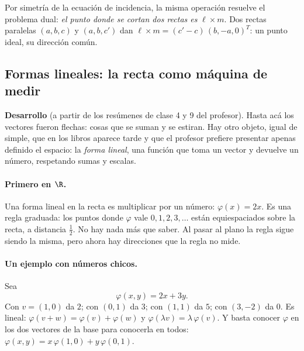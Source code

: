Por simetría de la ecuación de incidencia, la misma operación resuelve el problema dual:
\emph{el punto donde se cortan dos rectas es} \(\ell\times m\). Dos rectas paralelas
\((a,b,c)\) y \((a,b,c')\) dan \(\ell\times m=(c'-c)\,(b,-a,0)^T\): un punto ideal, su
dirección común.

\subsection{Formas lineales: la recta como máquina de medir}\label{sec:formas-lineales}

{\small\vspace{1mm}\par}
{\small\vspace{1mm}\par}


\textbf{Desarrollo} (a partir de los resúmenes de clase 4 y 9 del profesor). Hasta acá los
vectores fueron flechas: cosas que se suman y se estiran. Hay otro objeto, igual de simple,
que en los libros aparece tarde y que el profesor prefiere presentar apenas definido el
espacio: la \emph{forma lineal}, una función que toma un vector y devuelve un número,
respetando sumas y escalas.

\paragraph{Primero en \(\R\).} Una forma lineal en la recta es multiplicar por un número:
\(\varphi(x)=2x\). Es una regla graduada: los puntos donde \(\varphi\) vale
\(0,1,2,3,\ldots\) están equiespaciados sobre la recta, a distancia \(\tfrac12\). No hay
nada más que saber. Al pasar al plano la regla sigue siendo la misma, pero ahora hay
direcciones que la regla no mide.

\paragraph{Un ejemplo con números chicos.} Sea
\[
  \varphi(x,y)=2x+3y .
\]
Con \(v=(1,0)\) da \(2\); con \((0,1)\) da \(3\); con \((1,1)\) da \(5\); con \((3,-2)\)
da \(0\). Es lineal: \(\varphi(v+w)=\varphi(v)+\varphi(w)\) y
\(\varphi(\lambda v)=\lambda\,\varphi(v)\). Y basta conocer \(\varphi\) en los dos vectores
de la base para conocerla en todos: \(\varphi(x,y)=x\,\varphi(1,0)+y\,\varphi(0,1)\).

